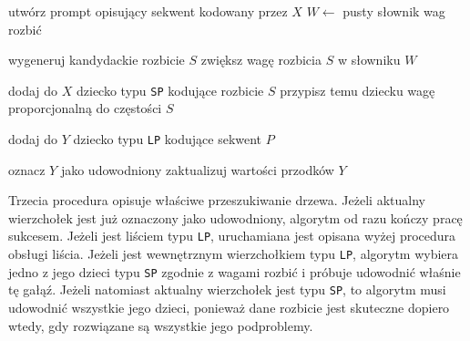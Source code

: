 \documentclass[shortabstract]{iithesis}
\theoremstyle{definition}
\theoremstyle{remark}
\theoremstyle{plain}
\begin{document}
\begin{algorithm}[H]
\caption{Rozbijanie liścia typu \texttt{LP}}
\label{alg:smash-leaf}
\begin{algorithmic}[1]
    \State utwórz prompt opisujący sekwent kodowany przez $X$
    \State $W \gets$ pusty słownik wag rozbić

        \State wygeneruj kandydackie rozbicie $S$
            \State zwiększ wagę rozbicia $S$ w słowniku $W$
        \EndIf
    \EndFor


        \State dodaj do $X$ dziecko typu \texttt{SP} kodujące rozbicie $S$
        \State przypisz temu dziecku wagę proporcjonalną do częstości $S$
    \EndFor

            \State dodaj do $Y$ dziecko typu \texttt{LP} kodujące sekwent $P$
        \EndFor

            \State oznacz $Y$ jako udowodniony
            \State zaktualizuj wartości przodków $Y$
        \EndIf
    \EndFor
\EndProcedure
\end{algorithmic}
\end{algorithm}


Trzecia procedura opisuje właściwe przeszukiwanie drzewa. Jeżeli aktualny
wierzchołek jest już oznaczony jako udowodniony, algorytm od razu kończy pracę
sukcesem. Jeżeli jest liściem typu \texttt{LP}, uruchamiana jest opisana wyżej
procedura obsługi liścia. Jeżeli jest wewnętrznym wierzchołkiem typu \texttt{LP},
algorytm wybiera jedno z jego dzieci typu \texttt{SP} zgodnie z wagami rozbić i próbuje
udowodnić właśnie tę gałąź. Jeżeli natomiast aktualny wierzchołek jest typu
\texttt{SP}, to algorytm musi udowodnić wszystkie jego dzieci, ponieważ dane rozbicie
jest skuteczne dopiero wtedy, gdy rozwiązane są wszystkie jego podproblemy.
\end{document}
